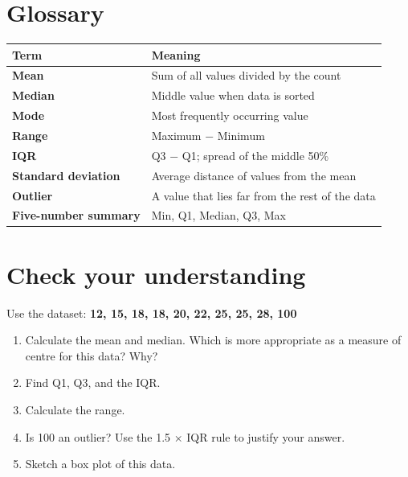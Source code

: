 \documentclass[
  11pt,
  a4paper,
  oneside,
  open=any]{scrbook}
\providecommand{\tightlist}{%
  \setlength{\itemsep}{0pt}\setlength{\parskip}{0pt}}
\begin{document}
\section{Glossary}\label{glossary-2}

\begin{longtable}[]{@{}ll@{}}
\toprule\noalign{}
Term & Meaning \\
\midrule\noalign{}
\endhead
\bottomrule\noalign{}
\endlastfoot
\textbf{Mean} & Sum of all values divided by the count \\
\textbf{Median} & Middle value when data is sorted \\
\textbf{Mode} & Most frequently occurring value \\
\textbf{Range} & Maximum − Minimum \\
\textbf{IQR} & Q3 − Q1; spread of the middle 50\% \\
\textbf{Standard deviation} & Average distance of values from the
mean \\
\textbf{Outlier} & A value that lies far from the rest of the data \\
\textbf{Five-number summary} & Min, Q1, Median, Q3, Max \\
\end{longtable}

\section{Check your understanding}\label{check-your-understanding-3}

Use the dataset: \textbf{12, 15, 18, 18, 20, 22, 25, 25, 28, 100}

\begin{enumerate}
\def\labelenumi{\arabic{enumi}.}
\tightlist
\item
  Calculate the mean and median. Which is more appropriate as a measure
  of centre for this data? Why?
\item
  Find Q1, Q3, and the IQR.
\item
  Calculate the range.
\item
  Is 100 an outlier? Use the 1.5 × IQR rule to justify your answer.
\item
  Sketch a box plot of this data.
\end{enumerate}
\end{document}
